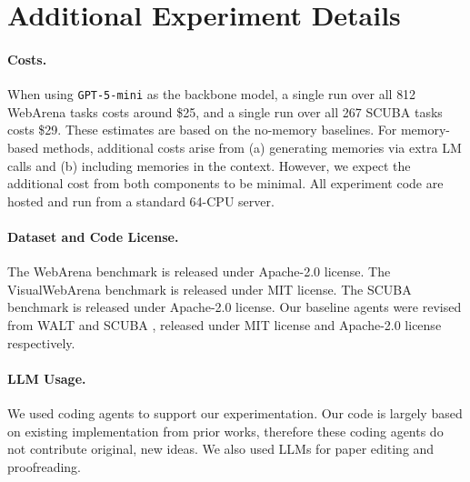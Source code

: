 \documentclass{article}
\begin{document}
\section{Additional Experiment Details}
\label{app:additional-experiment-details}
\paragraph{Costs.} When using \texttt{GPT-5-mini} as the backbone model, a single run over all 812 WebArena tasks costs around \$25, and a single run over all 267 SCUBA tasks costs \$29. These estimates are based on the no-memory baselines. For memory-based methods, additional costs arise from (a) generating memories via extra LM calls and (b) including memories in the context. However, we expect the additional cost from both components to be minimal. All experiment code are hosted and run from a standard 64-CPU server.

\paragraph{Dataset and Code License.} The WebArena benchmark \cite{zhou2024webarena} is released under Apache-2.0 license. The VisualWebArena benchmark \cite{koh-etal-2024-visualwebarena} is released under MIT license. The SCUBA benchmark \cite{dai2025scubasalesforcecomputeruse} is released under Apache-2.0 license. Our baseline agents were revised from WALT \cite{prabhu2026walt} and SCUBA \cite{dai2025scubasalesforcecomputeruse}, released under MIT license and Apache-2.0 license respectively.


\paragraph{LLM Usage.} We used coding agents to support our experimentation. Our code is largely based on existing implementation from prior works, therefore these coding agents do not contribute original, new ideas. We also used LLMs for paper editing and proofreading.

\end{document}
